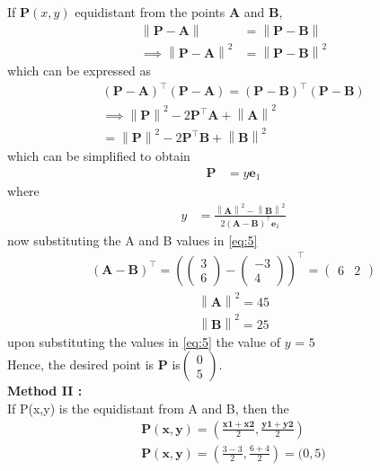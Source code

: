 \documentclass[12pt]{article}
\providecommand{\brak}[1]{\ensuremath{\left(#1\right)}}
\providecommand{\norm}[1]{\left\lVert#1\right\rVert}
\newcommand{\myvec}[1]{\ensuremath{\begin{pmatrix}#1\end{pmatrix}}}
\let\vec\mathbf
\begin{document}
\begin{enumerate}
  If $\vec{P} (x,y)$ equidistant from the points $\vec{A}$ and $\vec{B}$, 
\begin{align}
 \norm{\vec{P}-\vec{A}} &=
\norm{\vec{P}-\vec{B}} 
\\
 \implies \norm{\vec{P}-\vec{A}}^2 &=
\norm{\vec{P}-\vec{B}}^2 
\end{align}
which can be expressed as 
\begin{multline}
 \brak{\vec{P}-\vec{A}}^{\top} \brak{\vec{P}-\vec{A}}=
 \brak{\vec{P}-\vec{B}}^{\top} 
\brak{\vec{P}-\vec{B}}
\\
 \implies \norm{\vec{P}}^2-2{\vec{P}}^{\top}\vec{A} + \norm{\vec{A}}^2
 \\= \norm{\vec{P}}^2-2{\vec{P}}^{\top}\vec{B} + \norm{\vec{B}}^2
\end{multline}
which can be simplified to obtain
  \begin{align}
   \vec{P} &=
    y\vec{e}_1
  \end{align}
  where 
  \begin{align}
   y &=\frac{\norm{\vec{A}}^2 -\norm{\vec{B}}^2 }{2\brak{\vec{A}-\vec{B}}^{\top }\vec{e}_1
}\label{eq:5}  
  \end{align}
  now substituting the A and B values in \eqref{eq:5}
\begin{align}
 \brak{\vec{A}-\vec{B}}^{\top}=
 \brak{\myvec{3 \\ 6}-\myvec{-3\\4}}^{\top}
 =\myvec{6 & 2}
\end{align}
  \begin{align}
   \norm{\vec{A}}^2 = 45
    \end{align}
 \begin{align}
   \norm{\vec{B}}^2 = 25
    \end{align}
upon   substituting the values in \eqref{eq:5} the value of $y$ = $ 5$
\\Hence, the desired point is $\vec{P}$ is$\myvec{ 0 \\ 5}$.\\
\textbf{Method II :}\\
If P(x,y) is the equidistant from A and B, then the 
\begin{align}
    \vec{P(x,y)}=(\frac{\vec{x1}+\vec{x2}}{2},\frac{\vec{y1}+\vec{y2}}{2})\\
    \vec{P(x,y)}= ({\frac{3-3}{2}} , {\frac{6+4}{2}})= \vec(0,5)
\end{align}
\begin{figure}[!h]
 \begin{center}

\end{center}
\end{figure}
\end{enumerate}
\end{document}
